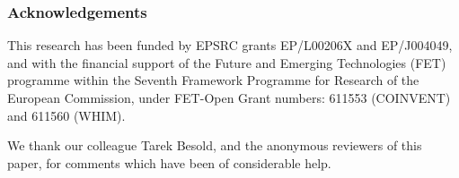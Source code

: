 \documentclass{article} %
\begin{document}




\tableofcontents

\newpage











\subsubsection*{Acknowledgements}
This research has been funded by EPSRC grants EP/L00206X and
EP/J004049, and with the financial support of the Future and Emerging
Technologies (FET) programme within the Seventh Framework Programme
for Research of the European Commission, under FET-Open Grant numbers:
611553 (COINVENT) and 611560 (WHIM).

We thank our colleague Tarek Besold, and the anonymous reviewers of
this paper, for comments which have been of considerable help.




% 
\end{document}

